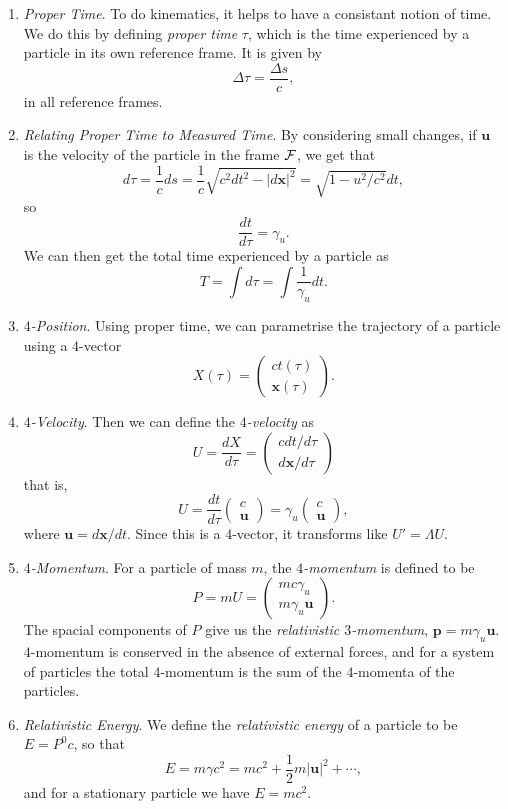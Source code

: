 \documentclass[11pt, a4paper]{scrartcl}
\newcommand{\vv}[1]{\boldsymbol{\mathbf{#1}}}
\theoremstyle{definition}
\begin{document}
\begin{enumerate}
	\item \emph{Proper Time}. To do kinematics, it helps to have a consistant notion of time. We do this by defining \emph{proper time} $\tau$, which is the time experienced by a particle in its own reference frame. It is given by
	$$
	\Delta \tau = \frac{\Delta s}{c},
	$$
	in all reference frames.
	\item \emph{Relating Proper Time to Measured Time}. By considering small changes, if $\vv u$ is the velocity of the particle in the frame $\mathcal{F}$, we get that
	$$
	d \tau = \frac{1}{c} d s = \frac{1}{c} \sqrt{c^2 d t^2 - |d\vv x|^2} = \sqrt{1 - u^2/c^2} d t,
	$$
	so
	$$ \frac{dt}{d \tau} = \gamma_u.
$$
We can then get the total time experienced by a particle as
$$
T = \int d \tau = \int \frac{1}{\gamma_u} d t.
$$
\item \emph{$4$-Position}. Using proper time, we can parametrise the trajectory of a particle using a $4$-vector
$$
X(\tau) = \begin{pmatrix}
	ct(\tau) \\
	\vv x(\tau)
\end{pmatrix}.
$$
\item \emph{$4$-Velocity}. Then we can define the \emph{$4$-velocity} as
$$
U = \frac{dX}{d \tau} = \begin{pmatrix}
	c dt/d\tau \\
	d \vv x / d \tau
\end{pmatrix}
$$
that is,
$$  U = \frac{dt}{d\tau} \begin{pmatrix}
	c \\ \vv u
\end{pmatrix} = \gamma_u \begin{pmatrix}
	c \\ \vv u
\end{pmatrix},
$$
where $\vv u = d \vv x/ dt$. Since this is a $4$-vector, it transforms like $U' = \Lambda U$. 
\item \emph{$4$-Momentum}. For a particle of mass $m$, the \emph{$4$-momentum} is defined to be
$$
P = mU = \begin{pmatrix}
	mc \gamma_u \\
	m \gamma_u \vv u
\end{pmatrix}.
$$
The spacial components of $P$ give us the \emph{relativistic $3$-momentum}, $\vv p = m \gamma_u \vv u$. $4$-momentum is conserved in the absence of external forces, and for a system of particles the total $4$-momentum is the sum of the $4$-momenta of the particles.
\item \emph{Relativistic Energy}. We define the \emph{relativistic energy} of a particle to be $E = P^0 c$, so that
$$
E = m \gamma c^2 = mc^2 + \frac{1}{2} m |\vv u|^2 + \cdots,
$$
and for a stationary particle we have $E = mc^2$. 


\end{enumerate}
\end{document}
